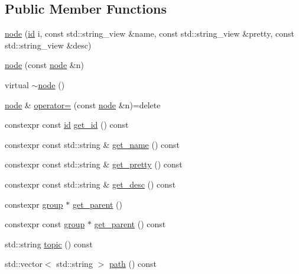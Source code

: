 \subsection*{Public Member Functions}
\begin{DoxyCompactItemize}
\item 
\hyperlink{classtelegraph_1_1node_a6891eb034aa7d988f1459d3ed2bc0106}{node} (\hyperlink{classtelegraph_1_1node_a90bc576d668ed141d5354a06aa9c8d9a}{id} i, const std\+::string\+\_\+view \&name, const std\+::string\+\_\+view \&pretty, const std\+::string\+\_\+view \&desc)
\item 
\hyperlink{classtelegraph_1_1node_a76746ee2232620309c5f60ca94af24ee}{node} (const \hyperlink{classtelegraph_1_1node}{node} \&n)
\item 
virtual \hyperlink{classtelegraph_1_1node_a7fe858c56729feae1e92625ff4827209}{$\sim$node} ()
\item 
\hyperlink{classtelegraph_1_1node}{node} \& \hyperlink{classtelegraph_1_1node_aa7aacc23330b9b8f98b05f8155481de7}{operator=} (const \hyperlink{classtelegraph_1_1node}{node} \&n)=delete
\item 
constexpr const \hyperlink{classtelegraph_1_1node_a90bc576d668ed141d5354a06aa9c8d9a}{id} \hyperlink{classtelegraph_1_1node_a8067bd46e650371084576234acfb8289}{get\+\_\+id} () const
\item 
constexpr const std\+::string \& \hyperlink{classtelegraph_1_1node_af33c56a0a2d2340c9cae412017a4fa4f}{get\+\_\+name} () const
\item 
constexpr const std\+::string \& \hyperlink{classtelegraph_1_1node_abeaa41162d9369bc6fc8bcbabe9d23e3}{get\+\_\+pretty} () const
\item 
constexpr const std\+::string \& \hyperlink{classtelegraph_1_1node_aff9478f841f7f791af1cd60513877440}{get\+\_\+desc} () const
\item 
constexpr \hyperlink{classtelegraph_1_1group}{group} $\ast$ \hyperlink{classtelegraph_1_1node_a2bcd9175c2e3b667422d86fc6fcc9959}{get\+\_\+parent} ()
\item 
constexpr const \hyperlink{classtelegraph_1_1group}{group} $\ast$ \hyperlink{classtelegraph_1_1node_adb0c016733fe55621b061d4e81d296fa}{get\+\_\+parent} () const
\item 
std\+::string \hyperlink{classtelegraph_1_1node_a3cb6dfaddab4d5953c04bb5ec348763b}{topic} () const
\item 
std\+::vector$<$ std\+::string $>$ \hyperlink{classtelegraph_1_1node_a1f1a005517baad53ec2407c27a13c9c4}{path} () const
\item 

\end{DoxyCompactItemize}
